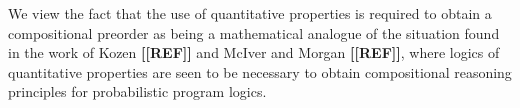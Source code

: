 We view the fact that the use of quantitative properties is required to obtain a compositional preorder as being
a mathematical analogue of the situation found in the work of Kozen
\textbf{[[REF]]} and McIver and Morgan \textbf{[[REF]]}, where 
logics of quantitative properties are seen to be necessary to obtain compositional reasoning principles for 
probabilistic program logics.


%
%
